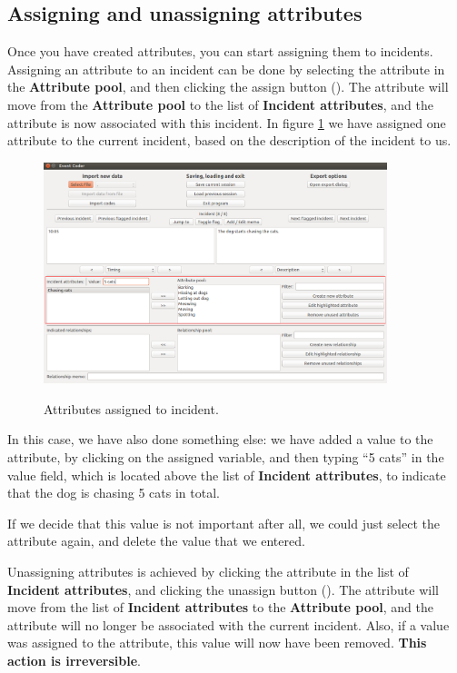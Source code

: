 \documentclass{memoir}
\begin{document}
\subsection{Assigning and unassigning attributes}
\label{sec:assigningunassigningattributes}

Once you have created attributes, you can start assigning them to incidents. Assigning an attribute to an incident can be done by selecting the attribute in the \textbf{Attribute pool}, and then clicking the assign button (\textbf{\guillemotleft}). The attribute will move from the \textbf{Attribute pool} to the list of \textbf{Incident attributes}, and the attribute is now associated with this incident. In figure \ref{fig:assignedattributes} we have assigned one attribute to the current incident, based on the description of the incident to us.

\begin{figure}[h!]
  \centering
  \caption{Attributes assigned to incident.}
  \includegraphics[width=100mm]{Screenshot_13.pdf}
  \label{fig:assignedattributes}
\end{figure}

In this case, we have also done something else: we have added a value to the attribute, by clicking on the assigned variable, and then typing ``5 cats'' in the value field, which is located above the list of \textbf{Incident attributes}, to indicate that the dog is chasing 5 cats in total.

If we decide that this value is not important after all, we could just select the attribute again, and delete the value that we entered.

Unassigning attributes is achieved by clicking the attribute in the list of \textbf{Incident attributes}, and clicking the unassign button (\textbf{\guillemotright}). The attribute will move from the list of \textbf{Incident attributes} to the \textbf{Attribute pool}, and the attribute will no longer be associated with the current incident. Also, if a value was assigned to the attribute, this value will now have been removed. \textbf{This action is irreversible}. 
\end{document}
